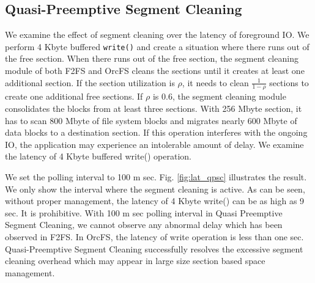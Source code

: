 \documentclass[pageno]{jpaper}
\begin{document}

\subsection{Quasi-Preemptive Segment Cleaning}
\label{subsec:qpsc_test}

We examine the effect of segment cleaning over the latency of
foreground IO. We perform 4 Kbyte buffered \texttt{write()} and create
a situation where there runs out of the free section.  When there runs out
of the free section, the segment cleaning module of both F2FS and OrcFS
cleans the sections until it creates at least one additional
section. If the section utilization is $\rho$, it needs to clean
$\frac{1}{1-\rho}$ sections to create one additional free sections.
If $\rho$ is 0.6, the segment cleaning module consolidates the blocks
from at least three sections. With 256 Mbyte section, it has to scan
800 Mbyte of file system blocks and migrates nearly 600 Mbyte of data
blocks to a destination section. If this operation interferes with the
ongoing IO, the application may experience an intolerable amount of
delay. We examine the latency of 4 Kbyte buffered write() operation.

We set the polling interval to 100 m sec.  Fig. \ref{fig:lat_qpsc}
illustrates the result.  We only show the interval where the segment
cleaning is active. As can be seen, without proper management, the
latency of 4 Kbyte write() can be as high as 9 sec. It is
prohibitive. With 100 m sec polling interval in Quasi Preemptive
Segment Cleaning, we cannot observe any abnormal delay which has been
observed in F2FS. In OrcFS, the latency of write operation is less
than one sec.  Quasi-Preemptive Segment Cleaning successfully resolves
the excessive segment cleaning overhead which may appear in large size
section based space management.
\end{document}
